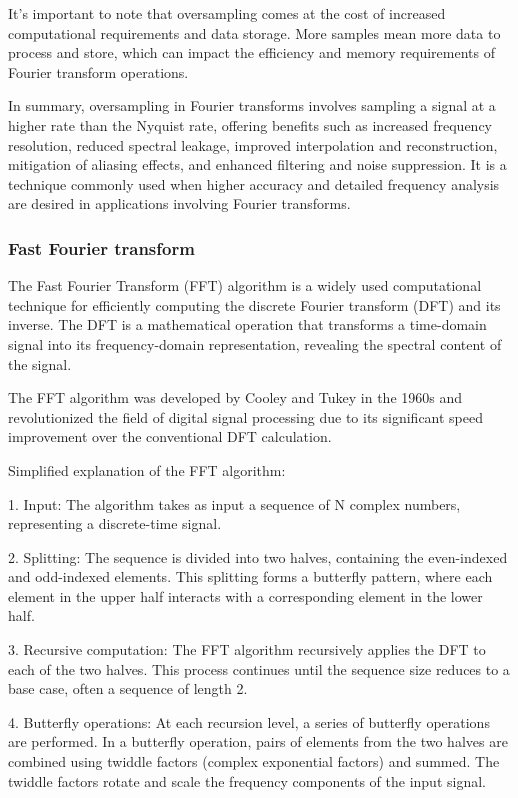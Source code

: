 It's important to note that oversampling comes at the cost of increased computational requirements and data storage. More samples mean more data to process and store, which can impact the efficiency and memory requirements of Fourier transform operations.

In summary, oversampling in Fourier transforms involves sampling a signal at a higher rate than the Nyquist rate, offering benefits such as increased frequency resolution, reduced spectral leakage, improved interpolation and reconstruction, mitigation of aliasing effects, and enhanced filtering and noise suppression. It is a technique commonly used when higher accuracy and detailed frequency analysis are desired in applications involving Fourier transforms.

\subsubsection{Fast Fourier transform}

The Fast Fourier Transform (FFT) algorithm is a widely used computational technique for efficiently computing the discrete Fourier transform (DFT) and its inverse.
The DFT is a mathematical operation that transforms a time-domain signal into its frequency-domain representation, revealing the spectral content of the signal.

The FFT algorithm was developed by Cooley and Tukey in the 1960s and revolutionized the field of digital signal processing due to its significant speed improvement over the conventional DFT calculation.

Simplified explanation of the FFT algorithm:

1. Input: The algorithm takes as input a sequence of N complex numbers, representing a discrete-time signal.

2. Splitting: The sequence is divided into two halves, containing the even-indexed and odd-indexed elements. This splitting forms a butterfly pattern, where each element in the upper half interacts with a corresponding element in the lower half.

3. Recursive computation: The FFT algorithm recursively applies the DFT to each of the two halves. This process continues until the sequence size reduces to a base case, often a sequence of length 2.

4. Butterfly operations: At each recursion level, a series of butterfly operations are performed. In a butterfly operation, pairs of elements from the two halves are combined using twiddle factors (complex exponential factors) and summed. The twiddle factors rotate and scale the frequency components of the input signal.

